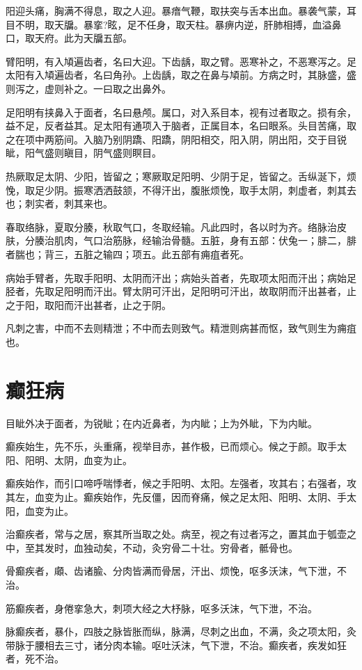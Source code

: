 \documentclass[a4paper,12pt,UTF8,twoside]{ctexbook}
\begin{document}
	阳迎头痛，胸满不得息，取之人迎。暴瘖气鞭，取扶突与舌本出血。暴袭气蒙，耳目不明，取天牖。暴挛?眩，足不任身，取天柱。暴痹内逆，肝肺相搏，血溢鼻口，取天府。此为天牖五部。
	
	臂阳明，有入頄遍齿者，名曰大迎。下齿龋，取之臂。恶寒补之，不恶寒泻之。足太阳有入頄遍齿者，名曰角孙。上齿龋，取之在鼻与頄前。方病之时，其脉盛，盛则泻之，虚则补之。一曰取之出鼻外。
	
	足阳明有挟鼻入于面者，名曰悬颅。属口，对入系目本，视有过者取之。损有余，益不足，反者益其。足太阳有通项入于脑者，正属目本，名曰眼系。头目苦痛，取之在项中两筋间。入脑乃别阴蹻、阳蹻，阴阳相交，阳入阴，阴出阳，交于目锐眦，阳气盛则瞋目，阴气盛则瞑目。
	
	热厥取足太阴、少阳，皆留之；寒厥取足阳明、少阴于足，皆留之。舌纵涎下，烦悗，取足少阴。振寒洒洒鼓颔，不得汗出，腹胀烦悗，取手太阴，刺虚者，刺其去也；刺实者，刺其来也。
	
	春取络脉，夏取分腠，秋取气口，冬取经输。凡此四时，各以时为齐。络脉治皮肤，分腠治肌肉，气口治筋脉，经输治骨髓。五脏，身有五部：伏兔一；腓二，腓者腨也；背三，五脏之输四；项五。此五部有痈疽者死。
	
	病始手臂者，先取手阳明、太阴而汗出；病始头首者，先取项太阳而汗出；病始足胫者，先取足阳明而汗出。臂太阴可汗出，足阳明可汗出，故取阴而汗出甚者，止之于阳，取阳而汗出甚者，止之于阴。
	
	凡刺之害，中而不去则精泄；不中而去则致气。精泄则病甚而怄，致气则生为痈疽也。
	\chapter{癫狂病}
	
	目眦外决于面者，为锐眦；在内近鼻者，为内眦；上为外眦，下为内眦。
	
	癫疾始生，先不乐，头重痛，视举目赤，甚作极，已而烦心。候之于颜。取手太阳、阳明、太阴，血变为止。
	
	癫疾始作，而引口啼呼喘悸者，候之手阳明、太阳。左强者，攻其右；右强者，攻其左，血变为止。癫疾始作，先反僵，因而脊痛，候之足太阳、阳明、太阴、手太阳，血变为止。
	
	治癫疾者，常与之居，察其所当取之处。病至，视之有过者泻之，置其血于瓠壶之中，至其发时，血独动矣，不动，灸穷骨二十壮。穷骨者，骶骨也。
	
	骨癫疾者，顑、齿诸腧、分肉皆满而骨居，汗出、烦悗，呕多沃沫，气下泄，不治。
	
	筋癫疾者，身倦挛急大，刺项大经之大杼脉，呕多沃沫，气下泄，不治。
	
	脉癫疾者，暴仆，四肢之脉皆胀而纵，脉满，尽刺之出血，不满，灸之项太阳，灸带脉于腰相去三寸，诸分肉本输。呕吐沃沫，气下泄，不治。癫疾者，疾发如狂者，死不治。
	
\end{document}
